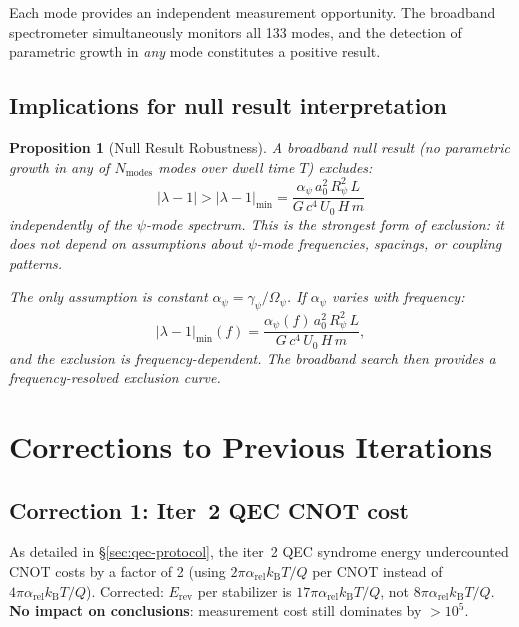 \documentclass[11pt]{article}
\newtheorem{proposition}[theorem]{Proposition}
\theoremstyle{definition}
\theoremstyle{remark}
\newcommand{\kB}{k_{\mathrm{B}}}
\newcommand{\arel}{\alpha_{\mathrm{rel}}}
\newcommand{\lam}{\lambda}
\newcommand{\Opsi}{\Omega_\psi}
\newcommand{\gpsi}{\gamma_\psi}
\begin{document}
Each mode provides an independent measurement opportunity. The broadband
spectrometer simultaneously monitors all 133 modes, and the detection of
parametric growth in \emph{any} mode constitutes a positive result.

\subsection{Implications for null result interpretation}

\begin{proposition}[Null Result Robustness]
A broadband null result (no parametric growth in any of
$N_{\mathrm{modes}}$ modes over dwell time $T$) excludes:
\begin{equation}
|\lam-1| > |\lam-1|_{\mathrm{min}} = \frac{\alpha_\psi\,a_0^2\,R_\psi^2\,L}
{G\,c^4\,U_0\,H\,m}
\end{equation}
independently of the $\psi$-mode spectrum. This is the strongest form
of exclusion: it does not depend on assumptions about $\psi$-mode
frequencies, spacings, or coupling patterns.

The only assumption is constant $\alpha_\psi = \gpsi/\Opsi$.
If $\alpha_\psi$ varies with frequency:
\begin{equation}
|\lam-1|_{\mathrm{min}}(f) = \frac{\alpha_\psi(f)\,a_0^2\,R_\psi^2\,L}
{G\,c^4\,U_0\,H\,m},
\end{equation}
and the exclusion is frequency-dependent. The broadband search then
provides a frequency-resolved exclusion curve.
\end{proposition}


\section{Corrections to Previous Iterations}
\label{sec:corrections}

\subsection{Correction 1: Iter~2 QEC CNOT cost}

As detailed in \S\ref{sec:qec-protocol}, the iter~2 QEC syndrome
energy undercounted CNOT costs by a factor of 2 (using $2\pi\arel\kB T/Q$
per CNOT instead of $4\pi\arel\kB T/Q$). Corrected: $E_{\mathrm{rev}}$
per stabilizer is $17\pi\arel\kB T/Q$, not $8\pi\arel\kB T/Q$.
\textbf{No impact on conclusions}: measurement cost still dominates
by $>10^5$.
\end{document}
